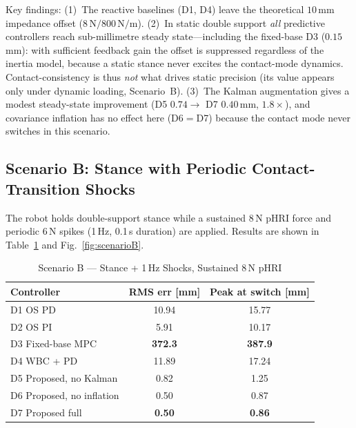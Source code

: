Key findings: (1)~The reactive baselines (D1, D4) leave the theoretical
$10$\,mm impedance offset ($8\,\text{N}/800\,\text{N/m}$). (2)~In static
double support \emph{all} predictive controllers reach sub-millimetre steady
state---including the fixed-base D3 ($0.15$\,mm): with sufficient feedback
gain the offset is suppressed regardless of the inertia model, because a
static stance never excites the contact-mode dynamics. Contact-consistency is
thus \emph{not} what drives static precision (its value appears only under
dynamic loading, Scenario~B). (3)~The Kalman augmentation gives a modest
steady-state improvement (D5 $0.74\to$ D7 $0.40$\,mm, $1.8\times$), and
covariance inflation has no effect here (D6$=$D7) because the contact mode
never switches in this scenario.

\subsection{Scenario B: Stance with Periodic Contact-Transition Shocks}

The robot holds double-support stance while a sustained 8\,N pHRI force
and periodic 6\,N spikes (1\,Hz, 0.1\,s duration) are applied.
Results are shown in Table~\ref{tab:scenarioB} and Fig.~\ref{fig:scenarioB}.

\begin{table}[!t]
\caption{Scenario B --- Stance + 1\,Hz Shocks, Sustained 8\,N pHRI}
\label{tab:scenarioB}
\renewcommand{\arraystretch}{1.2}
\begin{tabular}{lcc}
\toprule
\textbf{Controller} & \textbf{RMS err [mm]} & \textbf{Peak at switch [mm]} \\
\midrule
D1 OS PD          & 10.94 & 15.77 \\
D2 OS PI          &  5.91 & 10.17 \\
D3 Fixed-base MPC   & \textbf{372.3} & \textbf{387.9} \\
D4 WBC + PD         & 11.89 & 17.24 \\
D5 Proposed, no Kalman &  0.82 &  1.25 \\
D6 Proposed, no inflation &  0.50 &  0.87 \\
D7 Proposed full    & \textbf{0.50} & \textbf{0.86} \\
\bottomrule
\end{tabular}
\end{table}

